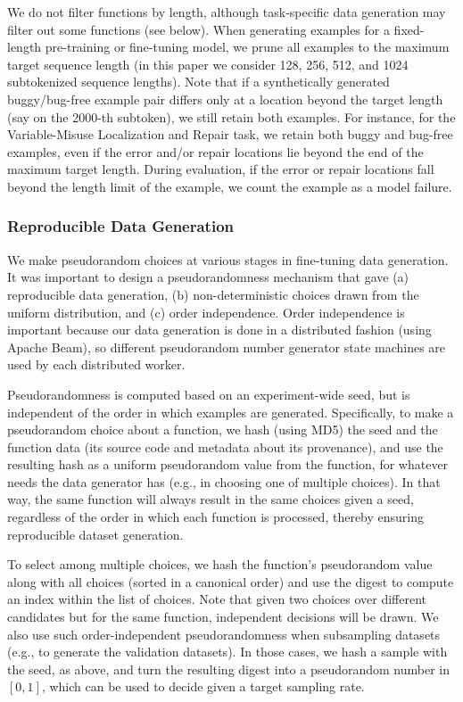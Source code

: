 \documentclass{article}
\begin{document}
We do not filter functions by length, although task-specific data generation may filter out some functions (see below). When generating examples for a fixed-length pre-training or fine-tuning model, we prune all examples to the maximum target sequence length (in this paper we consider \num{128}, \num{256}, \num{512}, and \num{1024} subtokenized sequence lengths). Note that if a synthetically generated buggy/bug-free example pair differs only at a location beyond the target length (say on the \num{2000}-th subtoken), we still retain both examples. For instance, for the Variable-Misuse Localization and Repair task, we retain both buggy and bug-free examples, even if the error and/or repair locations lie beyond the end of the maximum target length. During evaluation, if the error or repair locations fall beyond the length limit of the example, we count the example as a model failure.

\subsubsection{Reproducible Data Generation}
We make pseudorandom choices at various stages in fine-tuning data generation. It was important to design a pseudorandomness mechanism that gave (a) reproducible data generation, (b) non-deterministic choices drawn from the uniform distribution, and (c) order independence. Order independence is important because our data generation is done in a distributed fashion (using Apache Beam), so different pseudorandom number generator state machines are used by each distributed worker.

Pseudorandomness is computed based on an experiment-wide seed, but is independent of the order in which examples are generated. Specifically, to make a pseudorandom choice about a function, we hash (using MD5) the seed and the function data (its source code and metadata about its provenance), and use the resulting hash as a uniform pseudorandom value from the function, for whatever needs the data generator has (e.g., in choosing one of multiple choices). In that way, the same function will always result in the same choices given a seed, regardless of the order in which each function is processed, thereby ensuring reproducible dataset generation.

To select among multiple choices, we hash the function's pseudorandom value along with all choices (sorted in a canonical order) and use the digest to compute an index within the list of choices. Note that given two choices over different candidates but for the same function, independent decisions will be drawn. We also use such order-independent pseudorandomness when subsampling datasets (e.g., to generate the validation datasets). In those cases, we hash a sample with the seed, as above, and turn the resulting digest into a pseudorandom number in $[0, 1]$, which can be used to decide given a target sampling rate.
\end{document}
